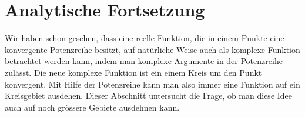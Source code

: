 %
%
%
\section{Analytische Fortsetzung
\label{buch:funktionentheorie:section:fortsetzung}}

Wir haben schon gesehen, dass eine reelle Funktion, die in einem
Punkte eine konvergente
Potenzreihe besitzt, auf natürliche Weise auch als komplexe Funktion
betrachtet werden kann, indem man komplexe Argumente in der Potenzreihe
zulässt.
Die neue komplexe Funktion ist ein einem Kreis um den Punkt
konvergent.
Mit Hilfe der Potenzreihe kann man also immer eine Funktion auf ein
Kreisgebiet ausdehen.
Dieser Abschnitt untersucht die Frage, ob man diese Idee auch auf
noch grössere Gebiete ausdehnen kann.
